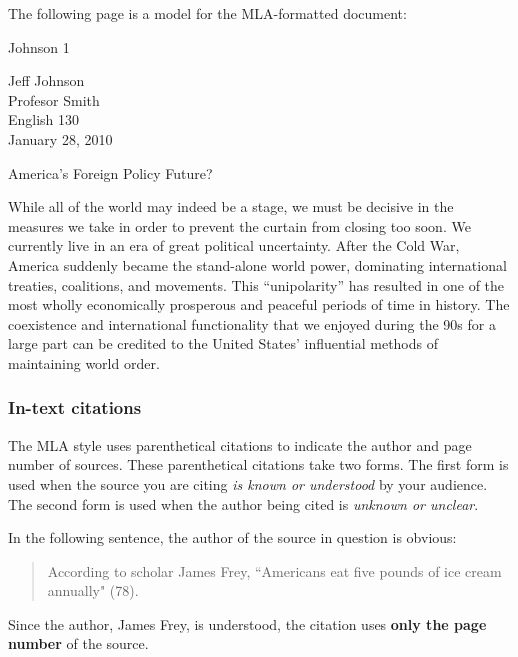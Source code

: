 \documentclass[12pt, hidelinks]{article} %
\newcommand{\tab}{\hspace*{2em}}
\begin{document}
The following page is a model for the MLA-formatted document:

\newpage
\thispagestyle{empty}
\begin{flushright}Johnson 1\end{flushright}
\bigskip
\begin{doublespace}
Jeff Johnson\\
Profesor Smith\\
English 130\\
January 28, 2010
\end{doublespace}
\begin{center}
America's Foreign Policy Future?
\end{center}
\begin{doublespace}

\tab While all of the world may indeed be a stage, we must be decisive in the measures we take in order to prevent the curtain from closing too soon. We currently live in an era of great political uncertainty. After the Cold War, America suddenly became the stand-alone world power, dominating international treaties, coalitions, and movements. This ``unipolarity'' has resulted in one of the most wholly economically prosperous and peaceful periods of time in history. The coexistence and international functionality that we enjoyed during the 90s for a large part can be credited to the United States' influential methods of maintaining world order.
\end{doublespace}
\newpage

\subsubsection{In-text citations}
The MLA style uses parenthetical citations to indicate the author and page number of sources. These parenthetical citations take two forms. The first form is used when the source you are citing \emph{is known or understood} by your audience. The second form is used when the author being cited is \emph{unknown or unclear}. 

In the following sentence, the author of the source in question is obvious:

\begin{quote}According to scholar James Frey, ``Americans eat five pounds of ice cream annually" (78).
\end{quote}

Since the author, James Frey, is understood, the citation uses \textbf{only the page number} of the source.
\end{document}
